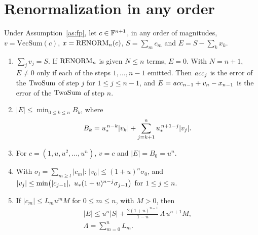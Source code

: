 \section{Renormalization in any order}

\begin{theorem}\label{thm:t1}
Under Assumption~\ref{as:fp}, let $c \in \mathbb{F}^{n+1}$, in any order of magnitudes, $v = \mathrm{VecSum}(c)$, $x = \mathrm{RENORM}_n(c)$, $S =
\sum_m c_m$ and $E = S - \sum_k x_k$.
\begin{enumerate}
\item[(a)] $\sum_j v_j = S$. If $\mathrm{RENORM}_n$ is given $N \le n$ terms, $E = 0$. With $N = n+1$, $E \ne 0$ only if each of the
steps $1, \dots, n-1$ emitted. Then $\mathit{acc}_j$ is the error of the $\mathrm{TwoSum}$ of step $j$ for $1 \le j \le n-1$, and $E =
\mathit{acc}_{n-1} + v_n - x_{n-1}$ is the error of the $\mathrm{TwoSum}$ of step $n$.
\item[(b)] $|E| \le \min_{0 \le k \le n} B_k$, where
\[
B_k = u_{*}^{\,n-k}|v_k| + \sum_{j=k+1}^{n} u_{*}^{\,n+1-j}|v_j|.
\]
\item[(c)] For $c = (1, u, u^2, \dots, u^n)$, $v = c$ and $|E| = B_0 = u^n$.
\item[(d)] With $\sigma_l = \sum_{m \ge l}|c_m|$: $|v_0| \le (1+u)^n\sigma_0$, and $|v_j| \le \min\bigl(|c_{j-1}|,\
u_{*}(1+u)^{n-j}\sigma_{j-1}\bigr)$ for $1 \le j \le n$.
\item[(e)] If $|c_m| \le L_m u^m M$ for $0 \le m \le n$, with $M > 0$, then
\begin{gather*}
|E| \le u^n|S| + \frac{2(1+u)^{n-1}}{1-u}\,\Lambda\,u^{n+1}M, \\
\Lambda = \sum_{m=0}^{n} L_m.
\end{gather*}
\end{enumerate}
\end{theorem}

